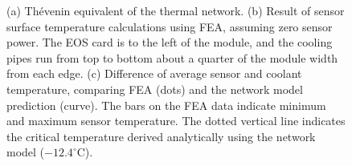 \begin{figure}[ht]
\centering
{}\quad
{}\quad\quad
{}
\caption{(a) Th\'{e}venin equivalent of the thermal network. (b) Result of sensor surface temperature calculations using FEA, assuming zero sensor power. The EOS card is to the left of the module, and the cooling pipes run from top to bottom about a quarter of the module width from each edge. (c) Difference of average sensor and coolant temperature, comparing FEA (dots) and the network model prediction (curve). The bars on the FEA data indicate minimum and maximum sensor temperature. The dotted vertical line indicates the critical temperature derived analytically using the network model ($-12.4^\circ$C).}
\label{fig:verification}
\end{figure}

